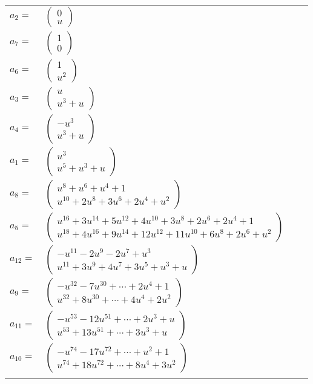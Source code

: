 \documentclass[1p]{elsarticle_modified}
\theoremstyle{definition}
\begin{document}
\begin{tabular}{m{7pt} m{180pt} m{7pt} m{180pt} }
\flushright $a_{2}=$&$\begin{pmatrix}0\\u\end{pmatrix}$ \\
\flushright $a_{7}=$&$\begin{pmatrix}1\\0\end{pmatrix}$ \\
\flushright $a_{6}=$&$\begin{pmatrix}1\\u^2\end{pmatrix}$ \\
\flushright $a_{3}=$&$\begin{pmatrix}u\\u^3+u\end{pmatrix}$ \\
\flushright $a_{4}=$&$\begin{pmatrix}- u^3\\u^3+u\end{pmatrix}$ \\
\flushright $a_{1}=$&$\begin{pmatrix}u^3\\u^5+u^3+u\end{pmatrix}$ \\
\flushright $a_{8}=$&$\begin{pmatrix}u^8+u^6+u^4+1\\u^{10}+2 u^8+3 u^6+2 u^4+u^2\end{pmatrix}$ \\
\flushright $a_{5}=$&$\begin{pmatrix}u^{16}+3 u^{14}+5 u^{12}+4 u^{10}+3 u^8+2 u^6+2 u^4+1\\u^{18}+4 u^{16}+9 u^{14}+12 u^{12}+11 u^{10}+6 u^8+2 u^6+u^2\end{pmatrix}$ \\
\flushright $a_{12}=$&$\begin{pmatrix}- u^{11}-2 u^9-2 u^7+u^3\\u^{11}+3 u^9+4 u^7+3 u^5+u^3+u\end{pmatrix}$ \\
\flushright $a_{9}=$&$\begin{pmatrix}- u^{32}-7 u^{30}+\cdots+2 u^4+1\\u^{32}+8 u^{30}+\cdots+4 u^4+2 u^2\end{pmatrix}$ \\
\flushright $a_{11}=$&$\begin{pmatrix}- u^{53}-12 u^{51}+\cdots+2 u^3+u\\u^{53}+13 u^{51}+\cdots+3 u^3+u\end{pmatrix}$ \\
\flushright $a_{10}=$&$\begin{pmatrix}- u^{74}-17 u^{72}+\cdots+u^2+1\\u^{74}+18 u^{72}+\cdots+8 u^4+3 u^2\end{pmatrix}$\\&\end{tabular}
\end{document}
